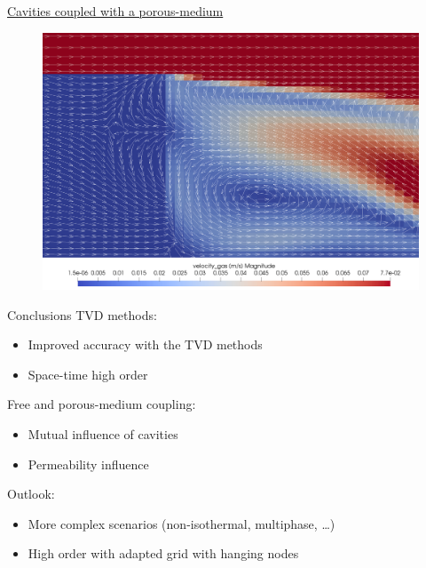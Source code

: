 \documentclass{beamer}
\begin{document}
\begin{frame}{\hyperlink{coupledSupp}{Cavities coupled with a porous-medium}}
\begin{figure}
	\centering
	\includegraphics[height=0.82\textheight]{coupled_second_cavity.png}
\end{figure}
\end{frame}
\begin{frame}{Conclusions}
TVD methods:
\begin{itemize}
	\item Improved accuracy with the TVD methods
	\item Space-time high order
\end{itemize}
Free and porous-medium coupling:
\begin{itemize}
	\item Mutual influence of cavities
	\item Permeability influence
\end{itemize}
Outlook:
\begin{itemize}
	\item More complex scenarios (non-isothermal, multiphase, \dots)
	\item High order with adapted grid with hanging nodes
\end{itemize}
\end{frame}
\end{document}

